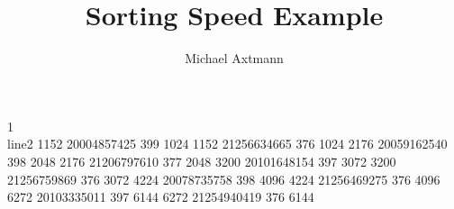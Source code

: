 \documentclass{article}
\begin{document}
\title{Sorting Speed Example}
\author{Michael Axtmann}
\maketitle

1 \\


line2
1152	20004857425	399	1024
1152	21256634665	376	1024
2176	20059162540	398	2048
2176	21206797610	377	2048
3200	20101648154	397	3072
3200	21256759869	376	3072
4224	20078735758	398	4096
4224	21256469275	376	4096
6272	20103335011	397	6144
6272	21254940419	376	6144
\end{document}
